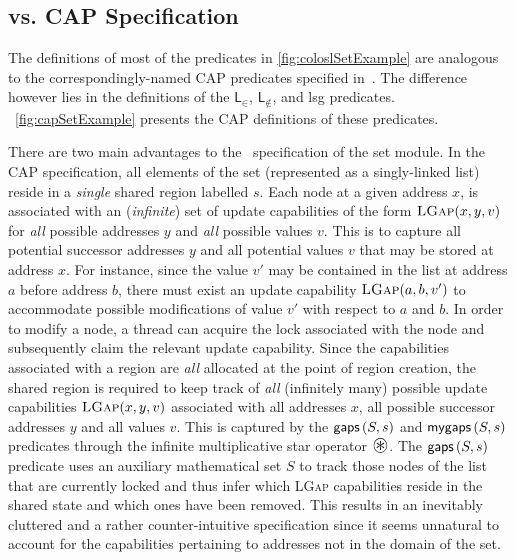 %

%
%
%
%
%
%
\clearpage\subsection*{\colosl vs. CAP Specification}
The definitions of most of the predicates in \fig\ref{fig:coloslSetExample} are analogous to the correspondingly-named CAP predicates specified in~\cite{cap-ecoop10}. The difference however lies in the definitions of the $\textsf{L}_{\in}$, $\textsf{L}_{\not\in}$, and \textsf{lsg} predicates. 
\fig~\ref{fig:capSetExample} presents the CAP definitions of these predicates. 

There are two main advantages to the \colosl\ specification of the set module. In the CAP specification, all elements of the set (represented as a singly-linked list) reside in a \emph{single} shared region labelled $s$.
Each node at a given address $x$, is associated with an (\emph{infinite}) set of update capabilities of the form $\textsc{LGap}(x, y, v)$ for \emph{all} possible addresses $y$ and \emph{all} possible values $v$. This is to capture all potential successor addresses $y$ and all potential values $v$ that may be stored at address $x$. For instance, since the value $v'$ may be contained in the list at address $a$ before address $b$, there must exist an update capability $\textsc{LGap}(a, b, v')$ to accommodate possible modifications of value $v'$ with respect to $a$ and $b$. In order to modify a node, a thread can acquire the lock associated with the node and subsequently claim the relevant update capability. Since the capabilities associated with a region are \emph{all} allocated at the point of region creation, the shared region is required to keep track of \emph{all} (infinitely many) possible update capabilities $\textsc{LGap}(x, y, v)$ associated with all addresses $x$, all possible successor addresses $y$ and all values $v$. This is captured by the $\textsf{gaps}\left(S, s\right)$ and $\textsf{mygaps}\left(S, s\right)$ predicates through the infinite multiplicative star operator $\iterStar$. The $\textsf{gaps}\left(S, s\right)$ predicate uses an auxiliary mathematical set $S$ to track those nodes of the list that are currently locked and thus infer which \textsc{LGap} capabilities reside in the shared state and which ones have been removed. This results in an inevitably cluttered and a rather counter-intuitive specification since it seems unnatural to account for the capabilities pertaining to addresses not in the domain of the set. 

